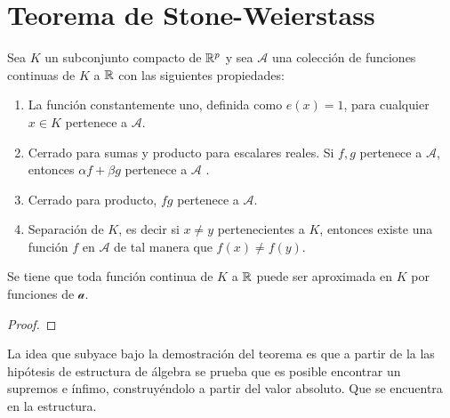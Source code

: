%

\chapter{Teorema de Stone-Weierstass }\label{ch:TeoremaStoneWeiertass}

\begin{teorema}

    Sea $K$ un subconjunto compacto de $\mathbb{R}^p$ y sea $\mathcal{A}$ una colección de 
    funciones continuas de $K$ a $\mathbb{R}$ con las siguientes propiedades: 

    \begin{enumerate}
        \item La función constantemente uno, definida como $e(x)=1$, para cualquier $x\in K$ pertenece a $\mathcal{A}$.
        \item Cerrado para sumas y producto para escalares reales. Si $f,g$ pertenece a  $\mathcal{A}$, entonces $\alpha f + \beta g$ pertenece a $\mathcal{A}$ . 
        \item Cerrado para producto, $fg$ pertenece a $\mathcal{A}$. 
        \item Separación de $K$, es decir si $x \neq y$ pertenecientes a $K$, entonces existe una función $f$ en $\mathcal{A}$  de tal manera que $f(x) \neq f(y)$. 
    \end{enumerate}
    
    Se tiene que toda función continua de $K$ a $\mathbb{R}$ puede ser aproximada en $K$ por funciones de $\mathcal a$. 
    \begin{proof}
        
    \end{proof}
\end{teorema}  

La idea que subyace bajo la demostración del teorema es que a partir de la las hipótesis de estructura de álgebra se prueba que es posible encontrar un supremos e ínfimo, construyéndolo a partir del valor absoluto.   Que se encuentra en la estructura.  

